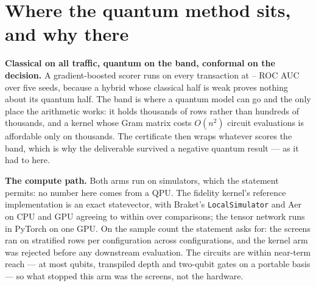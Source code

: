 \section{Where the quantum method sits, and why there}
\label{sec:hybrid}

\textbf{Classical on all traffic, quantum on the band, conformal on the decision.} A
gradient-boosted scorer runs on every transaction at
\ClaimGbdtFullAucMin--\ClaimGbdtFullAucMax{} ROC AUC over five seeds, because a hybrid whose
classical half is weak proves nothing about its quantum half. The band is where a
quantum model can go and the only place the arithmetic works: it holds thousands of rows rather
than hundreds of thousands, and a kernel whose Gram matrix costs $O(n^2)$ circuit evaluations is
affordable only on thousands. The certificate then wraps whatever scores the band, which is why
the deliverable survived a negative quantum result --- as it had to here.

\textbf{The compute path.} Both arms run on simulators, which the statement permits: no number
here comes from a QPU. The fidelity kernel's reference implementation is an exact statevector,
with Braket's \texttt{LocalSimulator} and Aer on CPU and GPU agreeing to within
\ClaimParityWorstDifference{} over \ClaimParityComparisons{} comparisons; the tensor network
runs in PyTorch on one GPU. On the sample count the statement asks for: the screens ran on
\ClaimScreenSamples{} stratified rows per configuration across \ClaimScreenConfigs{}
configurations, and the kernel arm was rejected before any downstream evaluation. The circuits
are within near-term reach --- at most \ClaimCircuitQubitsMax{} qubits, transpiled depth
\ClaimCircuitDepthMax{} and \ClaimCircuitTwoQubitMax{} two-qubit gates on a portable basis ---
so what stopped this arm was the screens, not the hardware.
